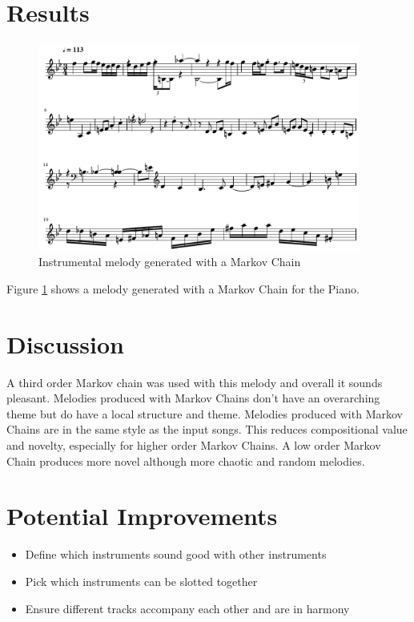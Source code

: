 \section{Results}
\begin{figure}[h!]
\centerline{\includegraphics[width=400px]{../images/instrumental_acousticgrand.pdf}}
\caption{Instrumental melody generated with a Markov Chain}
\label{ims:instrumentalmc}
\end{figure}

Figure \ref{ims:instrumentalmc} shows a melody generated with a Markov Chain for the Piano. 

\section{Discussion}

A third order Markov chain was used with this melody and overall it sounds pleasant. Melodies produced with Markov Chains don't have an overarching theme but do have a local structure and theme.
Melodies produced with Markov Chains are in the same style as the input songs. This reduces compositional value and novelty, especially for higher order Markov Chains. A low order Markov Chain produces more novel although more chaotic and random melodies. 

\section{Potential Improvements}
\begin{itemize}
\item Define which instruments sound good with other instruments
\item Pick which instruments can be slotted together
\item Ensure different tracks accompany each other and are in harmony
\end{itemize}

